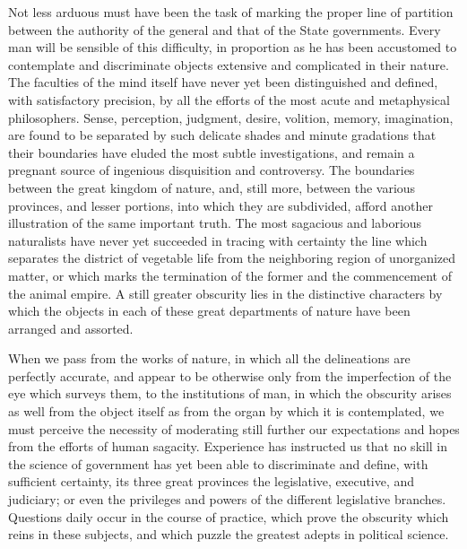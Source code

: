 Not less arduous must have been the task of marking the proper line of partition between the authority of the general and that of the State governments. 
Every man will be sensible of this difficulty, in proportion as he has been accustomed to contemplate and discriminate objects extensive and complicated in their nature. 
The faculties of the mind itself have never yet been distinguished and defined, with satisfactory precision, by all the efforts of the most acute and metaphysical philosophers. 
Sense, perception, judgment, desire, volition, memory, imagination, are found to be separated by such delicate shades and minute gradations that their boundaries have eluded the most subtle investigations, and remain a pregnant source of ingenious disquisition and controversy. 
The boundaries between the great kingdom of nature, and, still more, between the various provinces, and lesser portions, into which they are subdivided, afford another illustration of the same important truth. 
The most sagacious and laborious naturalists have never yet succeeded in tracing with certainty the line which separates the district of vegetable life from the neighboring region of unorganized matter, or which marks the termination of the former and the commencement of the animal empire. 
A still greater obscurity lies in the distinctive characters by which the objects in each of these great departments of nature have been arranged and assorted.

When we pass from the works of nature, in which all the delineations are perfectly accurate, and appear to be otherwise only from the imperfection of the eye which surveys them, to the institutions of man, in which the obscurity arises as well from the object itself as from the organ by which it is contemplated, we must perceive the necessity of moderating still further our expectations and hopes from the efforts of human sagacity. 
Experience has instructed us that no skill in the science of government has yet been able to discriminate and define, with sufficient certainty, its three great provinces the legislative, executive, and judiciary; or even the privileges and powers of the different legislative branches. 
Questions daily occur in the course of practice, which prove the obscurity which reins in these subjects, and which puzzle the greatest adepts in political science.

